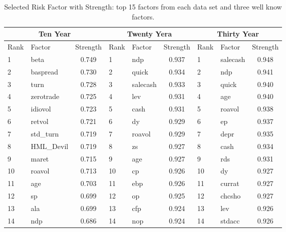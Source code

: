 \begin{table}[]
	\centering
	\caption{Selected Risk Factor with Strength: top 15 factors from each data set and three well know factors.}
	\begin{tabular}{llc|llc|llc}
		\hline
		\multicolumn{3}{c|}{Ten Year} & \multicolumn{3}{c|}{Twenty Yera} & \multicolumn{3}{c}{Thirty Year} \\ \hline
		Rank & Factor     & Strength & Rank   & Factor     & Strength   & Rank   & Factor     & Strength   \\ \hline
		1   & beta               & 0.749    & 1      & ndp           & 0.937      & 1      & salecash  & 0.948\\
		2   & baspread       & 0.730    & 2      & quick        & 0.934      & 2      & ndp          & 0.941\\
		3   & turn               & 0.728    & 3      & salecash   & 0.933      & 3      & quick      & 0.940\\
		4   & zerotrade      & 0.725    & 4      & lev            & 0.931      & 4      & age         & 0.940\\
		5   & idiovol           & 0.723    & 5      & cash         & 0.931      & 5      & roavol    & 0.938\\
		6   & retvol            & 0.721    & 6      & dy             & 0.929      & 6      & ep           & 0.937\\
		7   & std\_turn      & 0.719    & 7      & roavol      & 0.929      & 7      & depr       & 0.935\\
		8   & HML\_Devil & 0.719    & 8      & zs              & 0.927      & 8      & cash       & 0.934\\
		9   & maret           & 0.715    & 9        & age          & 0.927      & 9      & rds         & 0.931\\
		10 & roavol          & 0.713    & 10     & cp             & 0.926      & 10    & dy          & 0.927 \\
		11 & age               & 0.703    &11      & ebp           & 0.926      & 11     & currat   & 0.927 \\ 
		12 & sp                 & 0.699    &12      & op            & 0.925      &12       & chcsho  & 0.927 \\ 
		13 & ala                & 0.699    &13      & cfp          & 0.924       &13      & lev         & 0.926 \\ 
		14 & ndp              & 0.686    &14      & nop          & 0.924       &14     & stdacc     & 0.926 \\ 

\end{tabular}
\end{table}
